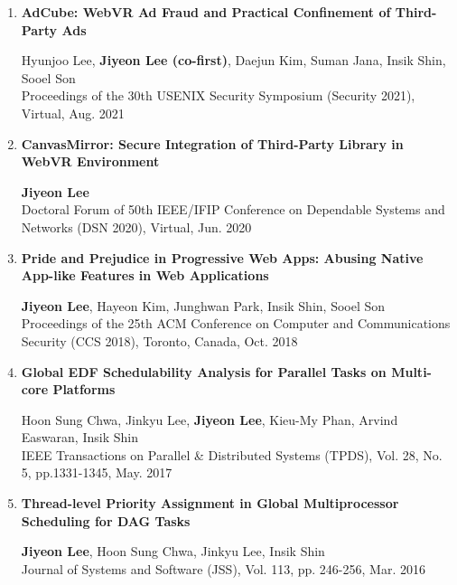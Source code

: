 \documentclass[11pt,letterpaper]{article}
\begin{document}
\begin{enumerate}
	\item \textbf{AdCube: WebVR Ad Fraud and Practical Confinement of Third-Party Ads} \\
	\begin{small}
		Hyunjoo Lee, \textbf{Jiyeon Lee (co-first)}, Daejun Kim, Suman Jana, Insik Shin, Sooel Son \\ 
		Proceedings of the 30th USENIX Security Symposium (Security 2021), Virtual, Aug. 2021
	\end{small}

	\item \textbf{CanvasMirror: Secure Integration of Third-Party Library in WebVR Environment} \\
	\begin{small}
		\textbf{Jiyeon Lee}\\ 
		Doctoral Forum of 50th IEEE/IFIP Conference on Dependable Systems and Networks (DSN 2020), Virtual, Jun. 2020
	\end{small}

	\item \textbf{Pride and Prejudice in Progressive Web Apps: Abusing Native App-like Features in Web Applications} \\
	\begin{small}
		\textbf{Jiyeon Lee}, Hayeon Kim, Junghwan Park, Insik Shin, Sooel Son\\ 
		Proceedings of the 25th ACM Conference on Computer and Communications Security (CCS 2018), Toronto, Canada, Oct. 2018
	\end{small}

	\item \textbf{Global EDF Schedulability Analysis for Parallel Tasks on Multi-core Platforms} \\
	\begin{small}
		Hoon Sung Chwa, Jinkyu Lee, \textbf{Jiyeon Lee}, Kieu-My Phan, Arvind Easwaran, Insik Shin\\ 
		IEEE Transactions on Parallel \& Distributed Systems (TPDS), Vol. 28, No. 5, pp.1331-1345, May. 2017
	\end{small}

	\item \textbf{Thread-level Priority Assignment in Global Multiprocessor Scheduling for DAG Tasks} \\
	\begin{small}
		\textbf{Jiyeon Lee}, Hoon Sung Chwa, Jinkyu Lee, Insik Shin\\ 
		Journal of Systems and Software (JSS), Vol. 113, pp. 246-256, Mar. 2016
	\end{small}


\end{enumerate}
\end{document}
